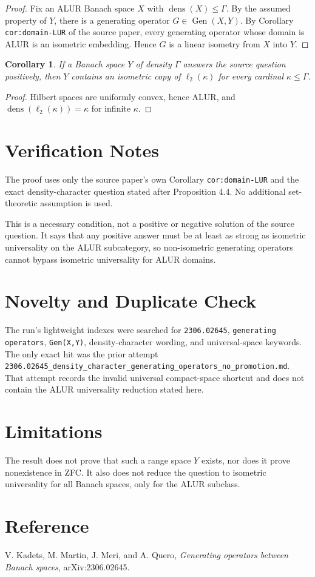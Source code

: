 \documentclass[11pt]{article}
\newtheorem{corollary}{Corollary}
\newcommand{\Gen}{\operatorname{Gen}}
\newcommand{\dens}{\operatorname{dens}}
\begin{document}
\begin{proof}
Fix an ALUR Banach space $X$ with $\dens(X)\leq\Gamma$.  By the assumed
property of $Y$, there is a generating operator $G\in\Gen(X,Y)$.  By
Corollary \texttt{cor:domain-LUR} of the source paper, every generating
operator whose domain is ALUR is an isometric embedding.  Hence $G$ is a
linear isometry from $X$ into $Y$.
\end{proof}

\begin{corollary}
If a Banach space $Y$ of density $\Gamma$ answers the source question
positively, then $Y$ contains an isometric copy of $\ell_2(\kappa)$ for every
cardinal $\kappa\leq\Gamma$.
\end{corollary}

\begin{proof}
Hilbert spaces are uniformly convex, hence ALUR, and
$\dens(\ell_2(\kappa))=\kappa$ for infinite $\kappa$.
\end{proof}

\section*{Verification Notes}

The proof uses only the source paper's own Corollary
\texttt{cor:domain-LUR} and the exact density-character question stated
after Proposition 4.4.  No additional set-theoretic assumption is used.

This is a necessary condition, not a positive or negative solution of the
source question.  It says that any positive answer must be at least as strong
as isometric universality on the ALUR subcategory, so non-isometric generating
operators cannot bypass isometric universality for ALUR domains.

\section*{Novelty and Duplicate Check}

The run's lightweight indexes were searched for \texttt{2306.02645},
\texttt{generating operators}, \texttt{Gen(X,Y)}, density-character wording,
and universal-space keywords.  The only exact hit was the prior attempt
\texttt{2306.02645\_density\_character\_generating\_operators\_no\_promotion.md}.
That attempt records the invalid universal compact-space shortcut and does
not contain the ALUR universality reduction stated here.

\section*{Limitations}

The result does not prove that such a range space $Y$ exists, nor does it
prove nonexistence in ZFC.  It also does not reduce the question to
isometric universality for all Banach spaces, only for the ALUR subclass.

\section*{Reference}

V. Kadets, M. Martin, J. Meri, and A. Quero, \emph{Generating operators
between Banach spaces}, arXiv:2306.02645.
\end{document}
